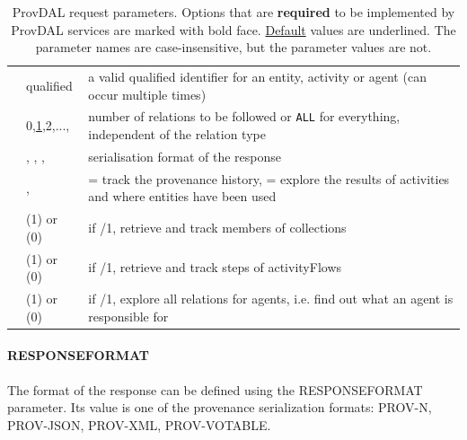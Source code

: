 \begin{table}[h]
\small
\begin{tabulary}{1.0\textwidth}{@{}p{0.25\textwidth}p{0.23\textwidth}p{0.45\textwidth}@{}}
\toprule
{} &  & \\\hline
\midrule
\textbf{} & qualified  & a valid qualified identifier for an entity, activity or agent (can occur multiple times)\\
\textbf{} & 0,\underline{1},2,...,  &  number of relations to be followed or \texttt{ALL} for everything, independent of the relation type\\
\textbf{} & , \newline{}, \newline{}, \newline{} & serialisation format of the response\\\hline
{} & ,  &  = track the provenance history, \newline{} = explore the results of activities and where entities have been used\\
 &  (1) or  (0) & if /1, retrieve and track members of collections\\
 &  (1) or  (0) & if /1, retrieve and track steps of activityFlows\\
 &  (1) or  (0) & if /1, explore all relations for agents, i.e. find out what an agent is responsible for\\
\bottomrule
\end{tabulary}
\caption{ProvDAL request parameters. Options that are \textbf{required} to be implemented by ProvDAL services are marked with bold face. \underline{Default} values are underlined. The parameter names are case-insensitive, but the parameter values are not.}
\label{tab:provdal-parameters}
\end{table}


\paragraph{RESPONSEFORMAT}
The format of the response can be defined using the RESPONSEFORMAT parameter. Its value is one of the provenance serialization formats: PROV-N, PROV-JSON, PROV-XML, PROV-VOTABLE.

